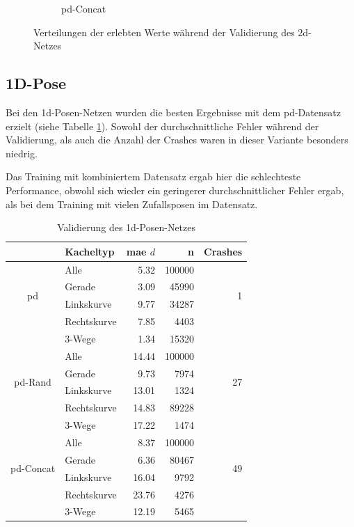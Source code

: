 \begin{figure}[H]
\begin{subfigure}[h]{0.5\textwidth}
		\caption{\glqq\acs{pd}-Concat\grqq}
		\label{2d-pd-concat-val-distr}
	\end{subfigure}
	\caption{Verteilungen der erlebten Werte während der Validierung des \acs{2d}-Netzes}
	\label{2d-val-distr}
\end{figure}

\subsection{1D-Pose}

Bei den \acs{1d}-Posen-Netzen wurden die besten Ergebnisse mit dem \glqq\acs{pd}\grqq-Datensatz erzielt (siehe Tabelle \ref{1d-validation}). Sowohl der durchschnittliche Fehler während der Validierung, als auch die Anzahl der Crashes waren in dieser Variante besonders niedrig.

Das Training mit kombiniertem Datensatz ergab hier die schlechteste Performance, obwohl sich wieder ein geringerer durchschnittlicher Fehler ergab, als bei dem Training mit vielen Zufallsposen im Datensatz.

\begin{table}[H]
	\centering
	\begin{tabular}[t]{|c|l|r|r|r|}
		\hline
		& \textbf{Kacheltyp} & \textbf{\acs{mae} $d$} & \textbf{n} & \textbf{Crashes} \\
		\hline
		\multirow{4}{*}{\acs{pd}} 
		& Alle
		& 5.32
		& 100000
		& \multirow{4}{*}{1}\\
		\cline{2-4}
		& Gerade
		&  3.09
		& 45990
		&\\
		\cline{2-4}
		& Linkskurve
		& 9.77
		& 34287
		&\\
		\cline{2-4}
		& Rechtskurve
		& 7.85
		& 4403
		&\\
		\cline{2-4}
		& 3-Wege
		&  1.34
		& 15320
		&\\
		\hline
		\multirow{4}{*}{\acs{pd}-Rand} 
		& Alle
		& 14.44
		& 100000
		& \multirow{4}{*}{27}\\
		\cline{2-4}
		& Gerade
		&  9.73
		& 7974
		& \\
		\cline{2-4}
		& Linkskurve
		& 13.01
		& 1324
		&\\
		\cline{2-4}
		& Rechtskurve
		& 14.83
		& 89228
		&\\
		\cline{2-4}
		& 3-Wege
		& 17.22
		& 1474
		&\\
		\hline
		\multirow{4}{*}{\acs{pd}-Concat} 
		& Alle
		& 8.37
		& 100000
		& \multirow{4}{*}{49}\\
		\cline{2-4}
		& Gerade
		& 6.36
		& 80467
		&\\
		\cline{2-4}
		& Linkskurve
		& 16.04
		& 9792
		&\\
		\cline{2-4}
		& Rechtskurve
		& 23.76
		& 4276
		&\\
		\cline{2-4}
		& 3-Wege
		& 12.19
		& 5465
		&\\
		\hline
	\end{tabular}
	\caption{Validierung des \acs{1d}-Posen-Netzes}
	\label{1d-validation}
\end{table}

